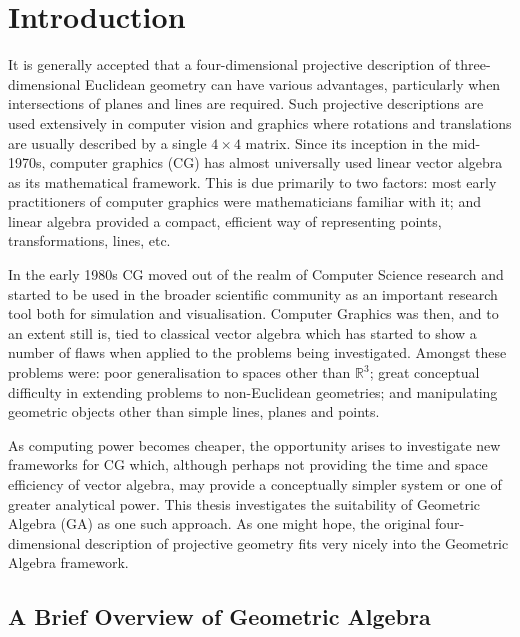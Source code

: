 \begin{savequote}
\end{savequote}

\chapter{Introduction}
\label{chap:introduction}

It is generally accepted that a four-dimensional projective description of
three-dimensional Euclidean geometry can have various advantages, particularly
when intersections of planes and lines are required. Such projective
descriptions are used extensively in computer vision and graphics where
rotations and translations are usually described by a single $4\times 4$
matrix. Since its inception in the mid-1970s, computer graphics (CG) has
almost universally used linear vector algebra as its mathematical framework.
This is due primarily to two factors: most early practitioners of computer
graphics were mathematicians familiar with it; and linear algebra provided a
compact, efficient way of representing points, transformations, lines, etc.

In the early 1980s CG moved out of the realm of Computer Science research and
started to be used in the broader scientific community as an important
research tool both for simulation and visualisation.  Computer Graphics was
then, and to an extent still is, tied to classical vector algebra which has
started to show a number of flaws when applied to the problems being
investigated. Amongst these problems were: poor generalisation to spaces other
than $\mathbb{R}^3$; great conceptual difficulty in extending problems to
non-Euclidean geometries; and manipulating geometric objects other than simple
lines, planes and points.

As computing power becomes cheaper, the opportunity arises to investigate new
frameworks for CG which, although perhaps not providing the time and space
efficiency of vector algebra, may provide a conceptually simpler system or one
of greater analytical power. This thesis investigates the suitability of
Geometric Algebra (GA) as one such approach. As one might hope, the original
four-dimensional description of projective geometry fits very nicely into the
Geometric Algebra framework\cite{HZ91,IJPR00}. 

\section{A Brief Overview of Geometric Algebra}

